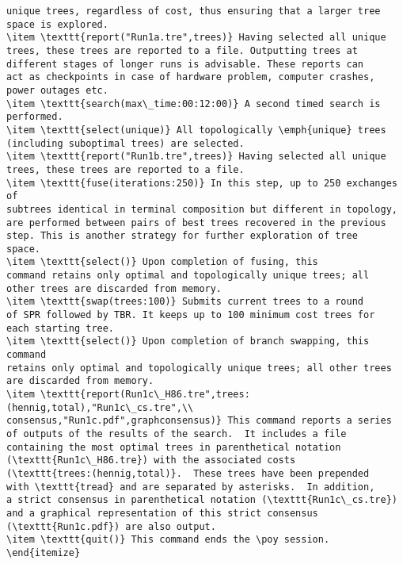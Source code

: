 \begin{verbatim}
unique trees, regardless of cost, thus ensuring that a larger tree
space is explored.  
\item \texttt{report("Run1a.tre",trees)} Having selected all unique 
trees, these trees are reported to a file. Outputting trees at 
different stages of longer runs is advisable. These reports can 
act as checkpoints in case of hardware problem, computer crashes, 
power outages etc.
\item \texttt{search(max\_time:00:12:00)} A second timed search is
performed.  
\item \texttt{select(unique)} All topologically \emph{unique} trees 
(including suboptimal trees) are selected.
\item \texttt{report("Run1b.tre",trees)} Having selected all unique
trees, these trees are reported to a file.  
\item \texttt{fuse(iterations:250)} In this step, up to 250 exchanges of
subtrees identical in terminal composition but different in topology,
are performed between pairs of best trees recovered in the previous
step. This is another strategy for further exploration of tree
space.  
\item \texttt{select()} Upon completion of fusing, this
command retains only optimal and topologically unique trees; all
other trees are discarded from memory.  
\item \texttt{swap(trees:100)} Submits current trees to a round 
of SPR followed by TBR. It keeps up to 100 minimum cost trees for 
each starting tree.  
\item \texttt{select()} Upon completion of branch swapping, this command
retains only optimal and topologically unique trees; all other trees
are discarded from memory.  
\item \texttt{report(Run1c\_H86.tre",trees:(hennig,total),"Run1c\_cs.tre",\\
consensus,"Run1c.pdf",graphconsensus)} This command reports a series
of outputs of the results of the search.  It includes a file
containing the most optimal trees in parenthetical notation
(\texttt{Run1c\_H86.tre}) with the associated costs
(\texttt{trees:(hennig,total)}.  These trees have been prepended
with \texttt{tread} and are separated by asterisks.  In addition,
a strict consensus in parenthetical notation (\texttt{Run1c\_cs.tre})
and a graphical representation of this strict consensus
(\texttt{Run1c.pdf}) are also output.  
\item \texttt{quit()} This command ends the \poy session.
\end{itemize}


\end{verbatim}
